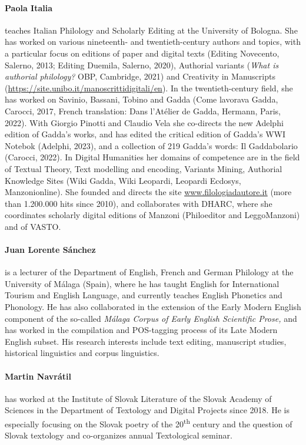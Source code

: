 \paragraph{Paola Italia} teaches Italian Philology and Scholarly Editing at the University of Bologna. She has worked on various nineteenth- and twentieth-century authors and topics, with a particular focus on editions of paper and digital texts (Editing Novecento, Salerno, 2013; Editing Duemila, Salerno, 2020), Authorial variants (\textit{What is authorial philology?} OBP, Cambridge, 2021) and Creativity in Manuscripts (\url{https://site.unibo.it/manoscrittidigitali/en}). In the twentieth-century field, she has worked on Savinio, Bassani, Tobino and Gadda (Come lavorava Gadda, Carocci, 2017, French translation: Dans l'Atélier de Gadda, Hermann, Paris, 2022). With Giorgio Pinotti and Claudio Vela she co-directs the new Adelphi edition of Gadda's works, and has edited the critical edition of Gadda’s WWI Notebok (Adelphi, 2023), and a collection of 219 Gadda's words: Il Gaddabolario (Carocci, 2022). In Digital Humanities her domains of competence are in the field of Textual Theory, Text modelling and encoding, Variants Mining, Authorial Knowledge Sites (Wiki Gadda, Wiki Leopardi, Leopardi Ecdosys, Manzonionline). She founded and directs the site \url{www.filologiadautore.it} (more than 1.200.000 hits since 2010), and collaborates with DHARC, where she coordinates scholarly digital editions of Manzoni (Philoeditor and LeggoManzoni) and of VASTO.

\paragraph{Juan Lorente Sánchez} is a lecturer of the Department of English, French and German Philology at the University of Málaga (Spain), where he has taught English for International Tourism and English Language, and currently teaches English Phonetics and Phonology. He has also collaborated in the extension of the Early Modern English component of the so-called \emph{Málaga Corpus of Early English Scientific Prose,} and has worked in the compilation and POS-tagging process of its Late Modern English subset. His research interests include text editing, manuscript studies, historical linguistics and corpus linguistics.

\paragraph{Martin Navrátil} has worked at the Institute of Slovak Literature of the Slovak Academy of Sciences in the Department of Textology and Digital Projects since 2018. He is especially focusing on the Slovak poetry of the 20\textsuperscript{th} century and the question of Slovak textology and co-organizes annual Textological seminar.

